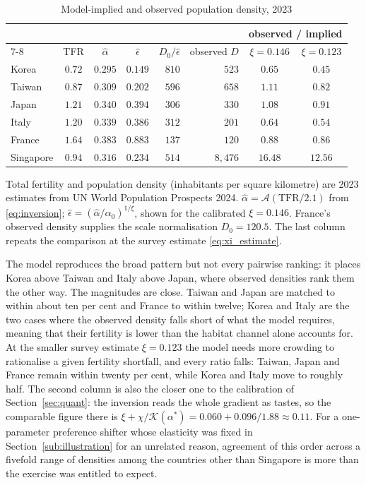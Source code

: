 \documentclass[11pt]{article}
\begin{document}
\begin{table}[h!]\centering
\begin{threeparttable}
\caption{Model-implied and observed population density, 2023}
\label{tab:crosscountry}
\begin{tabular}{lcccrrcc}
\toprule
& & & & & & \multicolumn{2}{c}{observed / implied}\\
\cmidrule(lr){7-8}
& TFR & $\hat\alpha$ & $\hat\epsilon$ & $D_0/\hat\epsilon$ & observed $D$ & $\xi=0.146$ & $\xi=0.123$\\
\midrule
Korea       & $0.72$ & $0.295$ & $0.149$ & $810$ & $523$  & $0.65$ & $0.45$\\
Taiwan      & $0.87$ & $0.309$ & $0.202$ & $596$ & $658$  & $1.11$ & $0.82$\\
Japan       & $1.21$ & $0.340$ & $0.394$ & $306$ & $330$  & $1.08$ & $0.91$\\
Italy       & $1.20$ & $0.339$ & $0.386$ & $312$ & $201$  & $0.64$ & $0.54$\\
France      & $1.64$ & $0.383$ & $0.883$ & $137$ & $120$  & $0.88$ & $0.86$\\
Singapore   & $0.94$ & $0.316$ & $0.234$ & $514$ & $8{,}476$ & $16.48$ & $12.56$\\
\bottomrule
\end{tabular}
\begin{tablenotes}\footnotesize
\item Total fertility and population density (inhabitants per square kilometre) are 2023 estimates
from UN World Population Prospects 2024. $\hat\alpha=\mathcal{A}(\text{TFR}/2.1)$ from
\eqref{eq:inversion}; $\hat\epsilon=(\hat\alpha/\alpha_0)^{1/\xi}$, shown for the calibrated
$\xi=0.146$. France's observed density supplies the scale normalisation $D_0=120.5$. The last column repeats the comparison at
the survey estimate \eqref{eq:xi_estimate}.
\end{tablenotes}
\end{threeparttable}
\end{table}

The model reproduces the broad pattern but not every pairwise ranking: it places Korea above Taiwan and Italy above Japan, where observed densities rank them the other way. The magnitudes are close. Taiwan and Japan are matched to
within about ten per cent and France to within twelve; Korea and Italy are the two cases where the
observed density falls short of what the model requires, meaning that their fertility is lower than
the habitat channel alone accounts for. At the smaller survey estimate $\xi=0.123$ the model needs
more crowding to rationalise a given fertility shortfall, and every ratio falls: Taiwan, Japan and
France remain within twenty per cent, while Korea and Italy move to roughly half. The second column is also the closer one to the
calibration of Section~\ref{sec:quant}: the inversion reads the whole gradient as tastes, so the
comparable figure there is $\xi+\chi/\mathcal{K}(\alpha^\ast)=0.060+0.096/1.88\approx0.11$. For a one-parameter preference shifter whose elasticity was
fixed in Section~\ref{sub:illustration} for an unrelated reason, agreement of this order across a
fivefold range of densities among the countries other than Singapore is more than the exercise was entitled to expect.
\end{document}
